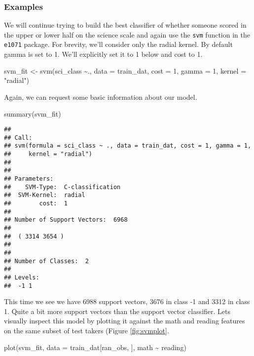 \documentclass[
]{book}
\newenvironment{Shaded}{\begin{snugshade}}{\end{snugshade}}
\newcommand{\AttributeTok}[1]{\textcolor[rgb]{0.77,0.63,0.00}{#1}}
\newcommand{\DecValTok}[1]{\textcolor[rgb]{0.00,0.00,0.81}{#1}}
\newcommand{\FunctionTok}[1]{\textcolor[rgb]{0.00,0.00,0.00}{#1}}
\newcommand{\NormalTok}[1]{#1}
\newcommand{\OtherTok}[1]{\textcolor[rgb]{0.56,0.35,0.01}{#1}}
\newcommand{\SpecialCharTok}[1]{\textcolor[rgb]{0.00,0.00,0.00}{#1}}
\newcommand{\StringTok}[1]{\textcolor[rgb]{0.31,0.60,0.02}{#1}}
\begin{document}
\hypertarget{examples}{%
\subsubsection{Examples}\label{examples}}

We will continue trying to build the best classifier of whether someone scored in the upper or lower half on the science scale and again use the \texttt{svm} function in the \texttt{e1071} package. For brevity, we'll consider only the radial kernel. By default gamma is set to 1. We'll explicitly set it to 1 below and cost to 1.

\begin{Shaded}
\begin{Highlighting}[]
\NormalTok{svm\_fit }\OtherTok{\textless{}{-}} \FunctionTok{svm}\NormalTok{(sci\_class }\SpecialCharTok{\textasciitilde{}}\NormalTok{., }\AttributeTok{data =}\NormalTok{ train\_dat,}
               \AttributeTok{cost =} \DecValTok{1}\NormalTok{,}
               \AttributeTok{gamma =} \DecValTok{1}\NormalTok{, }
               \AttributeTok{kernel =} \StringTok{"radial"}\NormalTok{)}
\end{Highlighting}
\end{Shaded}

Again, we can request some basic information about our model.

\begin{Shaded}
\begin{Highlighting}[]
\FunctionTok{summary}\NormalTok{(svm\_fit)}
\end{Highlighting}
\end{Shaded}

\begin{verbatim}
## 
## Call:
## svm(formula = sci_class ~ ., data = train_dat, cost = 1, gamma = 1, 
##     kernel = "radial")
## 
## 
## Parameters:
##    SVM-Type:  C-classification 
##  SVM-Kernel:  radial 
##        cost:  1 
## 
## Number of Support Vectors:  6968
## 
##  ( 3314 3654 )
## 
## 
## Number of Classes:  2 
## 
## Levels: 
##  -1 1
\end{verbatim}

This time we see we have 6988 support vectors, 3676 in class -1 and 3312 in class 1. Quite a bit more support vectors than the support vector classifier. Lets visually inspect this model by plotting it against the math and reading features on the same subset of test takers (Figure \ref{fig:svmplot}.

\begin{Shaded}
\begin{Highlighting}[]
\FunctionTok{plot}\NormalTok{(svm\_fit, }\AttributeTok{data =}\NormalTok{ train\_dat[ran\_obs, ], math }\SpecialCharTok{\textasciitilde{}}\NormalTok{ reading)}
\end{Highlighting}
\end{Shaded}
\end{document}
